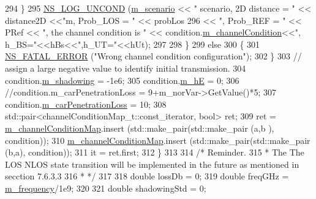 \begin{DoxyCode}
294                         \}
295                         \hyperlink{log-macros-disabled_8h_a0b36e5e182b37194f85ef1c5e979fb2e}{NS\_LOG\_UNCOND} (\hyperlink{classMmWave3gppPropagationLossModel_a3ba2b9e45f4d02e49620faf03f97e898}{m\_scenario} << \textcolor{stringliteral}{" scenario, 2D distance = "} << 
      distance2D <<\textcolor{stringliteral}{"m, Prob\_LOS = "} << probLos
296                                         << \textcolor{stringliteral}{", Prob\_REF = "} << PRef << \textcolor{stringliteral}{", the channel condition is "} << 
      condition.\hyperlink{structchannelCondition_a1fbbec1a89c5da0961efaca304ade4d1}{m\_channelCondition}<<\textcolor{stringliteral}{", h\_BS="}<<hBs<<\textcolor{stringliteral}{",h\_UT="}<<hUt);
297 
298                 \}
299                 \textcolor{keywordflow}{else}
300                 \{
301                         \hyperlink{group__fatal_ga5131d5e3f75d7d4cbfd706ac456fdc85}{NS\_FATAL\_ERROR} (\textcolor{stringliteral}{"Wrong channel condition configuration"});
302                 \}
303                 \textcolor{comment}{// assign a large negative value to identify initial transmission.}
304                 condition.\hyperlink{structchannelCondition_abf42a510bc41e8eb84c96f9b47cc8f47}{m\_shadowing} = -1e6;
305                 condition.\hyperlink{structchannelCondition_a6d2cc3deb0ce073a2b9a4d213e869985}{m\_hE} = 0;
306                 \textcolor{comment}{//condition.m\_carPenetrationLoss = 9+m\_norVar->GetValue()*5;}
307                 condition.\hyperlink{structchannelCondition_a3e9edf8d18ffacdfb4237471a6419627}{m\_carPenetrationLoss} = 10;
308                 std::pair<channelConditionMap\_t::const\_iterator, bool> ret;
309                 ret = \hyperlink{classMmWave3gppPropagationLossModel_a47c60c0cfcc0545dd3039393d21de5ac}{m\_channelConditionMap}.insert (std::make\_pair(std::make\_pair (a,b
      ), condition));
310                 \hyperlink{classMmWave3gppPropagationLossModel_a47c60c0cfcc0545dd3039393d21de5ac}{m\_channelConditionMap}.insert (std::make\_pair(std::make\_pair (b,a), 
      condition));
311                 it = ret.first;
312         \}
313 
314         \textcolor{comment}{/* Reminder.}
315 \textcolor{comment}{         * The The LOS NLOS state transition will be implemented in the future as mentioned in secction
       7.6.3.3}
316 \textcolor{comment}{         * */}
317 
318         \textcolor{keywordtype}{double} lossDb = 0;
319         \textcolor{keywordtype}{double} freqGHz = \hyperlink{classMmWave3gppPropagationLossModel_a2e61a4ea86089b9f974dbbb5180f9c86}{m\_frequency}/1e9;
320 
321         \textcolor{keywordtype}{double} shadowingStd = 0;

\end{DoxyCode}
